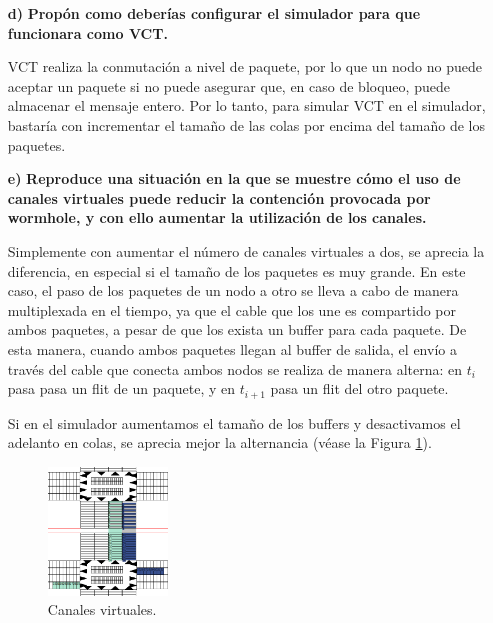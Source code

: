 \begin{itemize}
    \item[\textbf{d)}] \textbf{Propón como deberías configurar el simulador para que funcionara como VCT. }
    
    VCT realiza la conmutación a nivel de paquete, por lo que un nodo no puede aceptar un paquete si no puede asegurar que, en caso de bloqueo, puede almacenar el mensaje entero. Por lo tanto, para simular VCT en el simulador, bastaría con incrementar el tamaño de las colas por encima del tamaño de los paquetes.

    \item[\textbf{e)}] \textbf{Reproduce una situación en la que se muestre cómo el uso de canales virtuales puede reducir la contención provocada por wormhole, y con ello aumentar la utilización de los canales.}
    
    Simplemente con aumentar el número de canales virtuales a dos, se aprecia la diferencia, en especial si el tamaño de los paquetes es muy grande. En este caso, el paso de los paquetes de un nodo a otro se lleva a cabo de manera multiplexada en el tiempo, ya que el cable que los une es compartido por ambos paquetes, a pesar de que los exista un buffer para cada paquete. De esta manera, cuando ambos paquetes llegan al buffer de salida, el envío a través del cable que conecta ambos nodos se realiza de manera alterna: en $t_i$ pasa pasa un flit de un paquete, y en $t_{i+1}$ pasa un flit del otro paquete. 

    Si en el simulador aumentamos el tamaño de los buffers y desactivamos el adelanto en colas, se aprecia mejor la alternancia (véase la Figura \ref{fig:canales-virtuales}).

    \begin{figure}[h] %
      \centering
      \includegraphics[width=0.3\textwidth]{figs/canales-virtuales.png} %
      \caption{Canales virtuales.}
      \label{fig:canales-virtuales}
    \end{figure}

\end{itemize}